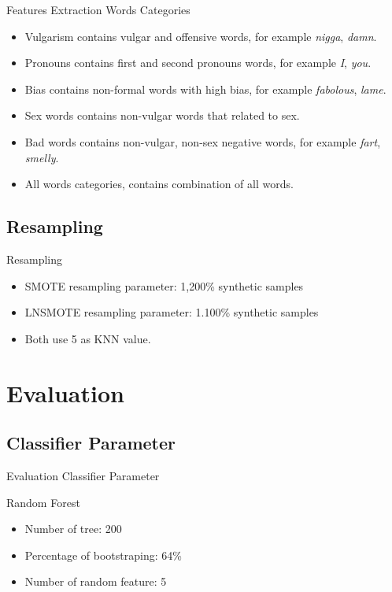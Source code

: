 \documentclass{beamer}
\begin{document}
\begin{frame}
	{Features Extraction}
	{Words Categories}
	\begin{itemize}
		\item Vulgarism contains vulgar and offensive words, for example
		\textit{nigga}, \textit{damn}.
		\item Pronouns contains first and second pronouns words, for example
		\textit{I}, \textit{you}.
		\item Bias contains non-formal words with high bias, for example
		\textit{fabolous}, \textit{lame}.
		\item Sex words contains non-vulgar words that related to sex.
		\item Bad words contains non-vulgar, non-sex negative words, for
		example \textit{fart}, \textit{smelly}.
		\item All words categories, contains combination of all words.
	\end{itemize}
\end{frame}

\subsection{Resampling}

\begin{frame}
	{Resampling}
	\begin{itemize}
		\item SMOTE resampling parameter: 1,200\% synthetic samples
		\item LNSMOTE resampling parameter: 1.100\% synthetic samples
		\item Both use 5 as KNN value.
	\end{itemize}
	
\end{frame}

\section{Evaluation}
\subsection{Classifier Parameter}

\begin{frame}
	{Evaluation}
	{Classifier Parameter}
	\begin{block}{Random Forest}
		\begin{itemize}
			\item Number of tree: 200
			\item Percentage of bootstraping: 64\%
			\item Number of random feature: 5
		\end{itemize}
	\end{block}
\end{frame}
\end{document}
